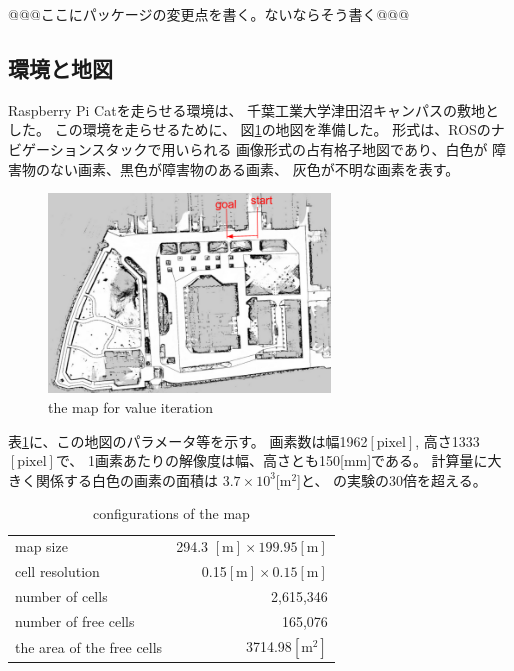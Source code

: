 \documentclass{jarticle}
\begin{document}
@@@ここにパッケージの変更点を書く。ないならそう書く@@@

\subsection{環境と地図}

Raspberry Pi Catを走らせる環境は、
千葉工業大学津田沼キャンパスの敷地とした。
この環境を走らせるために、
図\ref{fig:tsudanuma}の地図を準備した。
形式は、ROSのナビゲーションスタックで用いられる
画像形式の占有格子地図であり、白色が
障害物のない画素、黒色が障害物のある画素、
灰色が不明な画素を表す。

\begin{figure}[htb]
  \centering
   \includegraphics[height=53mm]{./figs/tsudanuma.png}
   \caption{the map for value iteration}
	\label{fig:tsudanuma}
\end{figure}

表\ref{table:map}に、この地図のパラメータ等を示す。
画素数は幅1962$\mathrm{[pixel]}$, 
高さ1333$\mathrm{[pixel]}$で、
1画素あたりの解像度は幅、高さとも150[mm]である。
計算量に大きく関係する白色の画素の面積は
$3.7\times 10^3$[m$^2$]と、\cite{上田rsj2021}
の実験の30倍を超える。

\begin{table}[hbt]
  \caption{conﬁgurations of the map}
	\label{table:map}
  \centering
	\begin{small}
  \begin{tabular}{l|r}
    \hline
    map size & 294.3 $\mathrm{[m]}\times 199.95\mathrm{[m]}$\\
    cell resolution &  0.15$\mathrm{[m]}\times 0.15\mathrm{[m]}$ \\
		number of cells & 2,615,346\\
    number of free cells & 165,076\\
		the area of the free cells & 3714.98$\mathrm{[m^2]}$\\
    \hline
  \end{tabular}
	\end{small}
\end{table}
\end{document}
